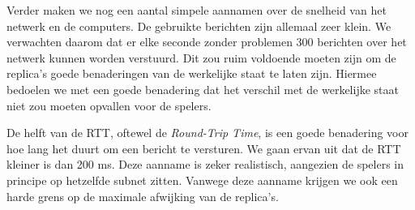     Verder maken we nog een aantal simpele aannamen over de snelheid van het netwerk en de computers. De gebruikte berichten zijn allemaal zeer klein. We verwachten daarom dat er elke seconde zonder problemen 300 berichten over het netwerk kunnen worden verstuurd. Dit zou ruim voldoende moeten zijn om de replica's goede benaderingen van de werkelijke staat te laten zijn. Hiermee bedoelen we met een goede benadering dat het verschil met de werkelijke staat niet zou moeten opvallen voor de spelers.

    De helft van de RTT, oftewel de \emph{Round-Trip Time}, is een goede benadering voor hoe lang het duurt om een bericht te versturen. We gaan ervan uit dat de RTT kleiner is dan 200 ms. Deze aanname is zeker realistisch, aangezien de spelers in principe op hetzelfde subnet zitten. Vanwege deze aanname krijgen we ook een harde grens op de maximale afwijking van de replica's.
    \label{app:MSCLobbyCon} 